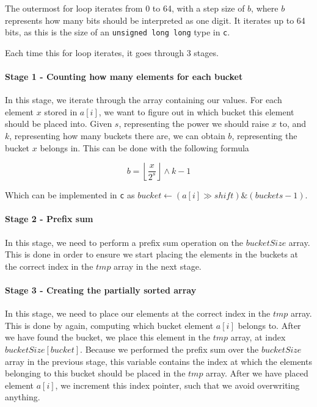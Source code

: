 \documentclass{article}
\begin{document}
The outermost for loop iterates from 0 to 64, with a step size of \( b \), where \( b \) represents how many bits should be interpreted as one digit. It iterates up to 64 bits, as this is the size of an \texttt{unsigned long long} type in \texttt{c}.
\medskip

Each time this for loop iterates, it goes through 3 stages.

\paragraph{Stage 1 - Counting how many elements for each bucket}
In this stage, we iterate through the array containing our values. For each element \( x \) stored in \( a[i] \), we want to figure out in which bucket this element should be placed into. Given \( s \), representing the power we should raise \( x \) to, and \( k \), representing how many buckets there are, we can obtain \( b \), representing the bucket \( x \) belongs in. This can be done with the following formula

\[ b = \left\lfloor\frac{x}{2^{s}}\right\rfloor \wedge k-1 \]

Which can be implemented in \texttt{c} as \(bucket \leftarrow (a[i] \gg shift) \& (buckets - 1)\).

\paragraph{Stage 2 - Prefix sum}
In this stage, we need to perform a prefix sum operation on the \( bucketSize \) array. This is done in order to ensure we start placing the elements in the buckets at the correct index in the \( tmp \) array in the next stage.

\paragraph{Stage 3 - Creating the partially sorted array}
In this stage, we need to place our elements at the correct index in the \( tmp \) array. This is done by again, computing which bucket element \( a[i] \) belongs to. After we have found the bucket, we place this element in the \( tmp \) array, at index \( bucketSize[bucket] \). Because we performed the prefix sum over the \( bucketSize \) array in the previous stage, this variable contains the index at which the elements belonging to this bucket should be placed in the \( tmp \) array. After we have placed element \( a[i] \), we increment this index pointer, such that we avoid overwriting anything.
\end{document}
